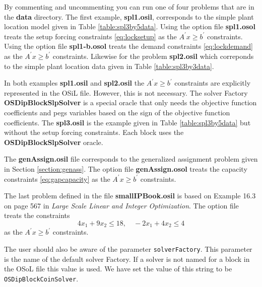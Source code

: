 By commenting and uncommenting you can run one of four problems that are in the
{\bf data} directory. The first example, {\bf spl1.osil}, corresponds to the
simple plant location model given in Table \ref{table:spl3by5data}. Using the
option file {\bf spl1.osol} treats the setup forcing constraints
\ref{eq:locksetup} as the $A^{\prime} x \ge b^{\prime}$ constraints. Using the
option file {\bf spl1-b.osol} treats the demand constraints
\ref{eq:lockdemand} as the $A^{\prime} x \ge b^{\prime}$ constraints. Likewise
for the problem {\bf spl2.osil} which correponds to the simple plant location
data given in Table \ref{table:spl3by3data}.

In both examples {\bf spl1.osil} and {\bf spl2.osil} the $A^{\prime} x \ge
b^{\prime}$ constraints are explicitly represented in the OSiL file. However,
this is not necessary. The solver Factory {\bf OSDipBlockSlpSolver} is a special
oracle that only needs the objective function coefficients and pegs variables
based on the sign of the objective function coefficients. The {\bf spl3.osil} is
the example given in Table \ref{table:spl3by5data} but without the setup forcing
constraints. Each block uses the {\bf OSDipBlockSlpSolver} oracle. 

The {\bf genAssign.osil} file corresponds to the generalized assignment problem
given in Section \ref{section:genass}.  The option file {\bf genAssign.osol} 
treats the capacity constraints \ref{eq:gapcapacity} as the $A^{\prime} x \ge
b^{\prime}$ constraints. 

The last problem defined in the file {\bf smallIPBook.osil} is based on Example
16.3 on page 567 in {\it Large Scale Linear and Integer Optimization}.  The
option file treats the constraints
$$
4x_{1} + 9 x_{2} \le 18, \quad -2x_{1} + 4 x_{2} \le 4
$$
as the $A^{\prime} x \ge b^{\prime}$ constraints.

The user should also be aware of the parameter {\tt solverFactory}. This
parameter is the name of the default solver Factory. If a solver is not named
for a block in the OSoL file this value is used. We have set the value of this
string to be {\tt OSDipBlockCoinSolver}.


   



